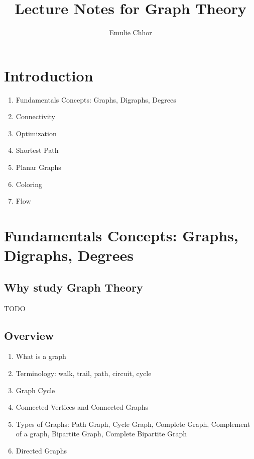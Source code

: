 \documentclass{article}
\begin{document}
\title{Lecture Notes for Graph Theory}
\author{Emulie Chhor}
\maketitle

\section*{Introduction}

\begin{enumerate}
    \item Fundamentals Concepts: Graphs, Digraphs, Degrees
    \item Connectivity
    \item Optimization
    \item Shortest Path
    \item Planar Graphs
    \item Coloring
    \item Flow
\end{enumerate}

\newtheorem{definition}{Definition}[subsection]
\newtheorem{theorem}{Theorem}[subsection]
\newtheorem{corollary}{Corollary}[subsection]
\newtheorem{lemma}[theorem]{Lemma}
\newtheorem{proposition}{Proposition}[section]
\newtheorem{axiom}{Axiome}
\newtheorem{property}{Propriété}[subsection]
\newtheorem*{remark}{Remarque}
\newtheorem*{problem}{Problème}
\newtheorem*{intuition}{Intuition}

\section{Fundamentals Concepts: Graphs, Digraphs, Degrees}

\subsection{Why study Graph Theory}%
\label{sub:Why study Graph Theory}

TODO

\subsection{Overview}%
\label{sub:Overview}

\begin{enumerate}
    \item What is a graph
    \item Terminology: walk, trail, path, circuit, cycle
    \item Graph Cycle
    \item Connected Vertices and Connected Graphs
    \item Types of Graphs: Path Graph, Cycle Graph, Complete Graph,
	Complement of a graph, Bipartite Graph, Complete Bipartite Graph
    \item Directed Graphs
\end{enumerate}
\end{document}
